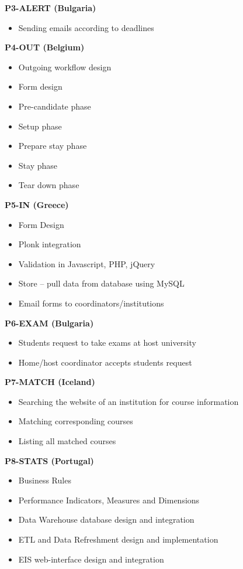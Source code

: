\textbf{P3-ALERT (Bulgaria)}
\begin{itemize}
  \item Sending emails according to deadlines
\end{itemize}


\textbf{P4-OUT (Belgium)}
\begin{itemize}
  \item Outgoing workflow design
  \item Form design
  \item Pre-candidate phase
  \item Setup phase
  \item Prepare stay phase
  \item Stay phase
  \item Tear down phase
\end{itemize}


\textbf{P5-IN (Greece)}
\begin{itemize}
  \item Form Design
  \item Plonk integration
  \item Validation in Javascript, PHP, jQuery
  \item Store – pull data from database using MySQL
  \item Email forms to coordinators/institutions
\end{itemize}


\textbf{P6-EXAM (Bulgaria)}
\begin{itemize}
  \item Students request to take exams at host university
  \item Home/host coordinator accepts students request
\end{itemize}


\textbf{P7-MATCH (Iceland)}
\begin{itemize}
  \item Searching the website of an institution for course information
  \item Matching corresponding courses
  \item Listing all matched courses
\end{itemize}


\textbf{P8-STATS (Portugal)}
\begin{itemize}
  \item Business Rules
  \item Performance Indicators, Measures and Dimensions
  \item Data Warehouse database design and integration
  \item ETL and Data Refreshment design and implementation
  \item EIS web-interface design and integration
\end{itemize}

